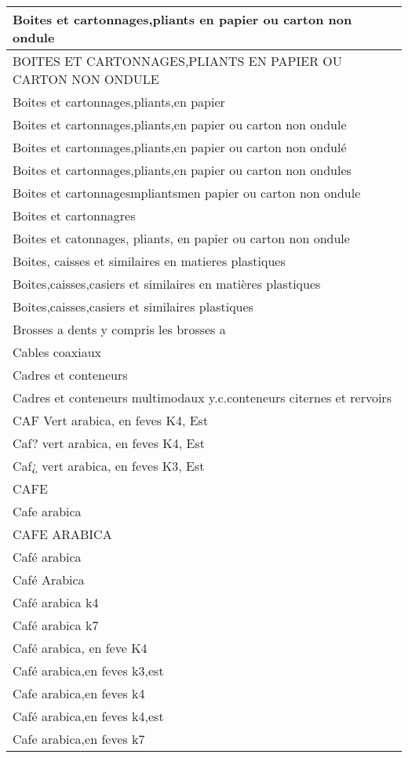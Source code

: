 \documentclass[
]{book}
\begin{document}
\begin{table}
\begin{tabular}[t]{l}
\hline
Boites et cartonnages,pliants en papier ou carton non ondule\\
\hline
BOITES ET CARTONNAGES,PLIANTS EN PAPIER OU CARTON NON ONDULE\\
\hline
Boites et cartonnages,pliants,en papier\\
\hline
Boites et cartonnages,pliants,en papier ou carton non ondule\\
\hline
Boites et cartonnages,pliants,en papier ou carton non ondulé\\
\hline
Boites et cartonnages,pliants,en papier ou carton non ondules\\
\hline
Boites et cartonnagesmpliantsmen papier ou carton non ondule\\
\hline
Boites et cartonnagres\\
\hline
Boites et catonnages, pliants, en papier ou carton non ondule\\
\hline
Boites, caisses et similaires en matieres plastiques\\
\hline
Boites,caisses,casiers et similaires en matières plastiques\\
\hline
Boites,caisses,casiers et similaires plastiques\\
\hline
Brosses a dents y compris les brosses a\\
\hline
Cables coaxiaux\\
\hline
Cadres et conteneurs\\
\hline
Cadres et conteneurs multimodaux y.c.conteneurs citernes et rervoirs\\
\hline
CAF Vert arabica, en feves K4, Est\\
\hline
Caf? vert arabica, en feves K4, Est\\
\hline
Caf¿ vert arabica, en feves K3, Est\\
\hline
CAFE\\
\hline
Cafe arabica\\
\hline
CAFE ARABICA\\
\hline
Café arabica\\
\hline
Café Arabica\\
\hline
Café arabica k4\\
\hline
Café arabica k7\\
\hline
Café arabica, en feve K4\\
\hline
Café arabica,en feves k3,est\\
\hline
Cafe arabica,en feves k4\\
\hline
Café arabica,en feves k4,est\\
\hline
Cafe arabica,en feves k7\\

\end{tabular}
\end{table}
\end{document}
